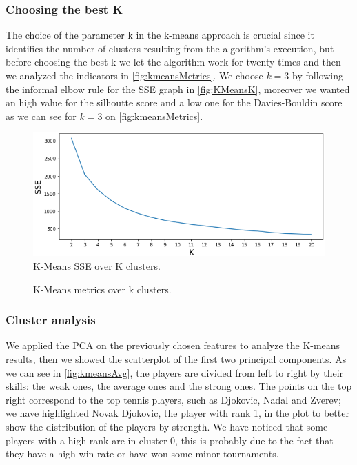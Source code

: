 \subsubsection{Choosing the best K}
The choice of the parameter k in the k-means approach is crucial since it identifies the number of clusters resulting from the algorithm's execution, but before choosing the best k we let the algorithm work for twenty times and then we analyzed the indicators in \autoref{fig:kmeansMetrics}. We choose $k=3$ by following the informal elbow rule for the SSE graph in \autoref{fig:KMeansK}, moreover we wanted an high value for the silhoutte score and a low one for the Davies-Bouldin score as we can see for $k=3$ on \autoref{fig:kmeansMetrics}.
\begin{figure}[H]
    \centering
    \includegraphics[width=0.45\linewidth]{images/clustering/KMeans/KMeans_K.png}
    \caption{K-Means SSE over K clusters.}
    \label{fig:KMeansK}
\end{figure}
\begin{figure}[H]
    \centering
    \caption{K-Means metrics over k clusters.}
    \label{fig:kmeansMetrics}
\end{figure}

\subsubsection{Cluster analysis}
We applied the PCA on the previously chosen features to analyze the K-means results, then we showed the scatterplot of the first two principal components. As we can see in \autoref{fig:kmeansAvg}, the players are divided from left to right by their skills: the weak ones, the average ones and the strong ones. The points on the top right correspond to the top tennis players, such as Djokovic, Nadal and Zverev; we have highlighted Novak Djokovic, the player with rank 1, in the plot to better show the distribution of the players by strength. We have noticed that some players with a high rank are in cluster 0, this is probably due to the fact that they have a high win rate or have won some minor tournaments.

